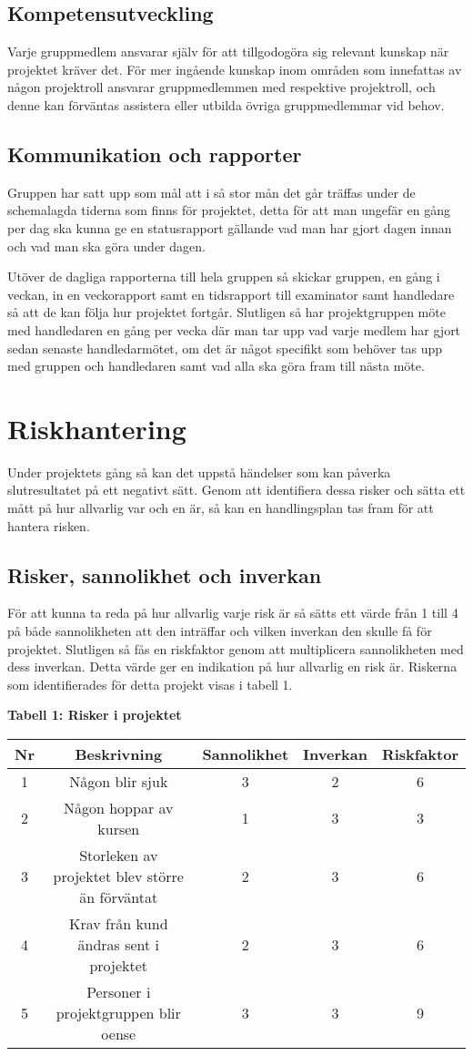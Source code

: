 \documentclass[a4paper,10pt]{article}
\begin{document}
\subsection{Kompetensutveckling}
Varje gruppmedlem ansvarar själv för att tillgodogöra sig relevant kunskap när projektet kräver det. För mer ingående kunskap inom områden som innefattas av någon projektroll ansvarar gruppmedlemmen med respektive projektroll, och denne kan förväntas assistera eller utbilda övriga gruppmedlemmar vid behov.
\subsection{Kommunikation och rapporter}
Gruppen har satt upp som mål att i så stor mån det går träffas under de schemalagda tiderna som finns för projektet, detta för att man ungefär en gång per dag ska kunna ge en statusrapport gällande vad man har gjort dagen innan och vad man ska göra under dagen.

Utöver de dagliga rapporterna till hela gruppen så skickar gruppen, en gång i veckan, in en veckorapport samt en tidsrapport till examinator samt handledare så att de kan följa hur projektet fortgår.
Slutligen så har projektgruppen möte med handledaren en gång per vecka där man tar upp vad varje medlem har gjort sedan senaste handledarmötet, om det är något specifikt som behöver tas upp med gruppen och handledaren samt vad alla ska göra fram till nästa möte.
\section{Riskhantering}
Under projektets gång så kan det uppstå händelser som kan påverka slutresultatet på ett negativt sätt. Genom att identifiera dessa risker och sätta ett mått på hur allvarlig var och en  är, så kan en handlingsplan tas fram för att hantera risken.
\subsection{Risker, sannolikhet och inverkan}
För att kunna ta reda på hur allvarlig varje risk är så sätts ett värde från 1 till 4 på både sannolikheten att den inträffar och vilken inverkan den skulle få för projektet. Slutligen så fås en riskfaktor genom att  multiplicera sannolikheten med dess inverkan. Detta värde ger en indikation på hur allvarlig en risk är. Riskerna som identifierades för detta projekt visas i tabell 1.

\textbf{Tabell 1: Risker i projektet}\\
\begin{tabular}{|c c c c c|}
 \hline
 Nr & Beskrivning & Sannolikhet & Inverkan & Riskfaktor\\
 \hline
 1 & Någon blir sjuk & 3 & 2 & 6\\
 2 & Någon hoppar av kursen & 1 & 3 & 3\\
 3 & Storleken av projektet blev större än förväntat & 2 & 3 & 6\\
 4 & Krav från kund ändras sent i projektet & 2 & 3 & 6\\
 5 & Personer i projektgruppen blir oense & 3 & 3 & 9\\
 \hline
\end{tabular}
\end{document}
